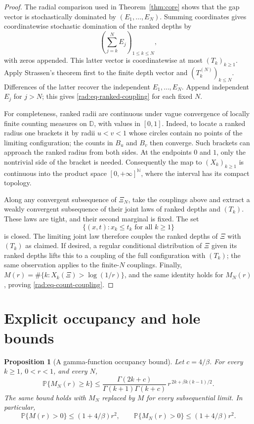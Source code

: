 \documentclass[11pt,a4paper]{article}
\numberwithin{equation}{section}
\newtheorem{proposition}[theorem]{Proposition}
\theoremstyle{definition}
\theoremstyle{remark}
\newcommand{\D}{\mathbb D}
\newcommand{\Pbb}{\mathbb P}
\newcommand{\N}{\mathbb N}
\begin{document}
\begin{proof}
The radial comparison used in Theorem~\ref{thm:core} shows that the gap
vector is stochastically dominated by $(E_1,\ldots,E_N)$. Summing coordinates gives
coordinatewise stochastic domination of the ranked depths by
\[
 \left(\sum_{j=k}^N E_j\right)_{1\leq k\leq N},
\]
with zeros appended.  This latter vector is coordinatewise at most
$(T_k)_{k\geq1}$. Apply Strassen's theorem first to the finite depth
vector and $(T_k^{(N)})_{k\leq N}$. Differences of the latter recover
the independent $E_1,\ldots,E_N$. Append independent $E_j$ for $j>N$;
this gives \eqref{rad:eq-ranked-coupling} for each fixed $N$.

For completeness, ranked radii are continuous under vague convergence
of locally finite counting measures on $\D$, with values in $[0,1]$.
Indeed, to locate a ranked radius one brackets it by radii $u<v<1$
whose circles contain no points of the limiting configuration; the
counts in $B_u$ and $B_v$ then converge.  Such brackets can approach the
ranked radius from both sides.  At the endpoints $0$ and $1$, only the
nontrivial side of the bracket is needed.  Consequently the map to
$(X_k)_{k\geq1}$ is continuous into the product space
$[0,+\infty]^{\N}$, where the interval has its compact topology.

Along any convergent subsequence of $\Xi_N$, take the couplings above
and extract a weakly convergent subsequence of their joint laws of
ranked depths and $(T_k)$.  These laws are tight, and their second
marginal is fixed.  The set
\[
 \{(x,t):x_k\leq t_k\text{ for all }k\geq1\}
\]
is closed.  The limiting joint law therefore couples the ranked depths
of $\Xi$ with $(T_k)$ as claimed.  If desired, a regular conditional
distribution of $\Xi$ given its ranked depths lifts this to a coupling
of the full configuration with $(T_k)$; the same observation applies
to the finite-$N$ couplings.  Finally,
$M(r)=\#\{k:X_k(\Xi)>\log(1/r)\}$, and the same
identity holds for $M_N(r)$, proving \eqref{rad:eq-count-coupling}.
\end{proof}

\section{Explicit occupancy and hole bounds}
\label{rad:section-explicit}

\begin{proposition}[A gamma-function occupancy bound]
\label{rad:prop-gamma-tail}
Let $c=4/\beta$.  For every $k\geq1$, $0<r<1$, and every $N$,
\begin{equation}
 \Pbb\{M_N(r)\geq k\}
 \leq
 \frac{\Gamma(2k+c)}{\Gamma(k+1)\Gamma(k+c)}\,
 r^{\,2k+\beta k(k-1)/2}.
 \label{rad:eq-gamma-tail}
\end{equation}
The same bound holds with $M_N$ replaced by $M$ for every subsequential
limit.  In particular,
\begin{equation}
 \Pbb\{M(r)>0\}\leq (1+4/\beta)r^2,
 \qquad
 \Pbb\{M_N(r)>0\}\leq (1+4/\beta)r^2.
 \label{rad:eq-small-disk}
\end{equation}
\end{proposition}
\end{document}
